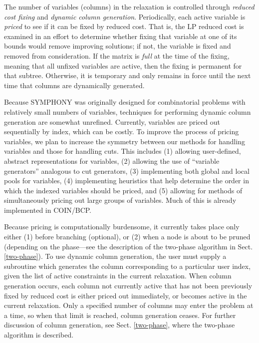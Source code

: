 The number of variables (columns) in the relaxation is controlled
through {\em reduced cost fixing} and {\em dynamic column generation}.
Periodically, each active variable is {\em priced} to see if it can be
fixed by reduced cost. That is, the LP reduced cost is examined in an
effort  to determine whether fixing that variable at
one of its bounds would remove improving solutions; if not, the
variable is fixed and removed from consideration. If the matrix is
{\em full} at the time of the fixing, meaning that all unfixed
variables are active, then the fixing is permanent for that subtree.
Otherwise, it is temporary and only remains in force until the next
time that columns are dynamically generated.

Because SYMPHONY was originally designed for combinatorial problems
with relatively small numbers of variables, techniques for performing
dynamic column generation are somewhat unrefined. Currently, variables
are priced out sequentially by index, which can be costly. To improve
the process of pricing variables, we plan to increase the symmetry
between our methods for handling variables and those for handling
cuts. This includes (1) allowing user-defined, abstract
representations for variables, (2) allowing the use of ``variable
generators'' analogous to cut generators, (3) implementing both global
and local pools for variables, (4) implementing heuristics that help
determine the order in which the indexed variables should be priced,
and (5) allowing for methods of simultaneously pricing out large
groups of variables. Much of this is already implemented in COIN/BCP.

Because pricing is computationally burdensome, it currently takes
place only either (1) before branching (optional), or (2) when a node
is about to be pruned (depending on the phase---see the description of
the two-phase algorithm in Sect. \ref{two-phase}). To use dynamic
column generation, the user must supply a subroutine which generates
the column corresponding to a particular user index, given the list of
active constraints in the current relaxation. When column generation
occurs, each column not currently active that has not been previously
fixed by reduced cost is either priced out immediately, or becomes
active in the current relaxation. Only a specified number of columns
may enter the problem at a time, so when that limit is reached, column
generation ceases. For further discussion of column generation, see
Sect. \ref{two-phase}, where the two-phase algorithm is described.

